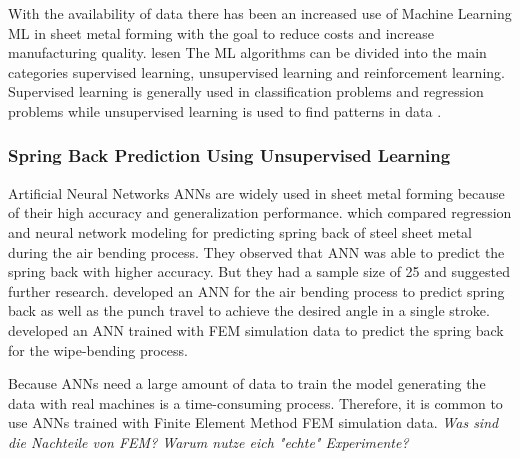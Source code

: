 
With the availability of data there has been an increased use of Machine Learning \ac{
    ML} in
sheet metal forming with the goal to reduce costs and increase manufacturing quality.
\cite{bock_reviewapplicationmachine_2019} \cite[]{cao_manufacturingadvancedsmart_2019}
lesen
The ML algorithms can be divided into the main categories supervised learning,
unsupervised
learning and reinforcement learning. \cite[]{liu_reinforcementlearningfreeform_2020}
Supervised learning is generally used in classification problems and regression
problems while
unsupervised learning is used to find patterns in data \cite[p.
2]{cruz_applicationmachinelearning_2021}.

\subsubsection*{Spring Back Prediction Using Unsupervised Learning}
Artificial Neural Networks \ac{ANN}s are widely used in sheet metal forming because of
their high
accuracy and generalization performance. \cite[p. 2]{cruz_applicationmachinelearning_2021}
\cite[]{narayanasamy_comparisonregressionartificial_2012a} which compared regression
and neural
network modeling for predicting spring back of steel sheet metal during the air bending
process.
They observed that ANN was able to predict the spring back with higher accuracy. But
they had a
sample size of 25 and suggested further research.
\cite[]{inamdar_developmentartificialneural_2000} developed an ANN for the air bending
process to
predict spring back as well as the punch travel to achieve the desired angle in a
single stroke.
\cite[]{kazan_predictionspringbackwipebending_2009} developed an ANN trained with FEM
simulation
data to predict the spring back for the wipe-bending process.


Because \ac{ANN}s need a large amount of data to train the model generating the data
with real
machines is a time-consuming process.
Therefore, it is common to use \ac{ANN}s trained with Finite Element Method \ac{FEM}
simulation
data.
\textit{Was sind die Nachteile von FEM? Warum nutze eich "echte" Experimente?}

